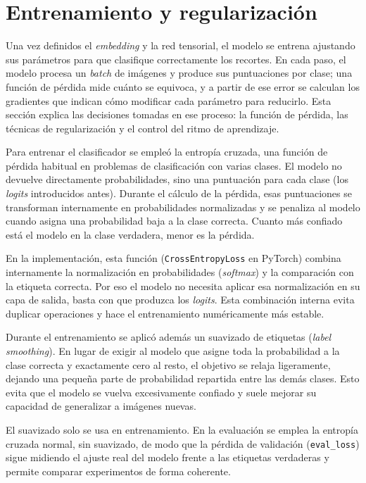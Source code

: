 \section{Entrenamiento y regularización}\label{sec:entrenamiento}

Una vez definidos el \textit{embedding} y la red tensorial, el modelo se entrena ajustando sus parámetros para que clasifique correctamente los recortes. En cada paso, el modelo procesa un \textit{batch} de imágenes y produce sus puntuaciones por clase; una función de pérdida mide cuánto se equivoca, y a partir de ese error se calculan los gradientes que indican cómo modificar cada parámetro para reducirlo. Esta sección explica las decisiones tomadas en ese proceso: la función de pérdida, las técnicas de regularización y el control del ritmo de aprendizaje.

Para entrenar el clasificador se empleó la entropía cruzada, una función de pérdida habitual en problemas de clasificación con varias clases. El modelo no devuelve directamente probabilidades, sino una puntuación para cada clase (los \textit{logits} introducidos antes). Durante el cálculo de la pérdida, esas puntuaciones se transforman internamente en probabilidades normalizadas y se penaliza al modelo cuando asigna una probabilidad baja a la clase correcta. Cuanto más confiado está el modelo en la clase verdadera, menor es la pérdida.

En la implementación, esta función (\texttt{CrossEntropyLoss} en PyTorch) combina internamente la normalización en probabilidades (\textit{softmax}) y la comparación con la etiqueta correcta. Por eso el modelo no necesita aplicar esa normalización en su capa de salida, basta con que produzca los \textit{logits}. Esta combinación interna evita duplicar operaciones y hace el entrenamiento numéricamente más estable.

Durante el entrenamiento se aplicó además un suavizado de etiquetas (\textit{label smoothing}). En lugar de exigir al modelo que asigne toda la probabilidad a la clase correcta y exactamente cero al resto, el objetivo se relaja ligeramente, dejando una pequeña parte de probabilidad repartida entre las demás clases. Esto evita que el modelo se vuelva excesivamente confiado y suele mejorar su capacidad de generalizar a imágenes nuevas.

El suavizado solo se usa en entrenamiento. En la evaluación se emplea la entropía cruzada normal, sin suavizado, de modo que la pérdida de validación (\texttt{eval\_loss}) sigue midiendo el ajuste real del modelo frente a las etiquetas verdaderas y permite comparar experimentos de forma coherente.

